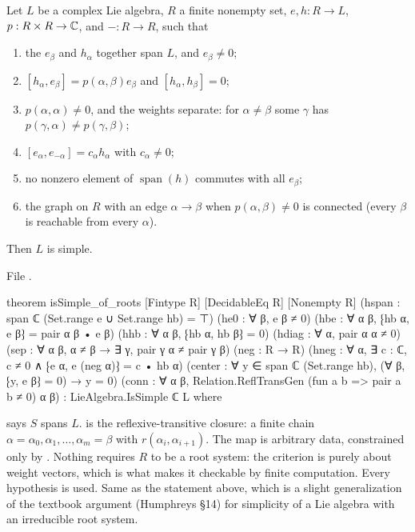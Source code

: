 \begin{theorem}\label{l23:thm:rootspace}
Let $L$ be a complex Lie algebra, $R$ a finite nonempty set, $e,h:R\to L$, $p:R\times R\to{\mathbb{C}}$, and $-:R\to R$, such that
\begin{enumerate}
\item the $e_\beta$ and $h_\alpha$ together span $L$, and $e_\beta\ne0$;
\item $[h_\alpha,e_\beta]=p(\alpha,\beta)e_\beta$ and $[h_\alpha,h_\beta]=0$;
\item $p(\alpha,\alpha)\ne0$, and the weights separate: for $\alpha\ne\beta$ some $\gamma$ has $p(\gamma,\alpha)\ne p(\gamma,\beta)$;
\item $[e_\alpha,e_{-\alpha}]=c_\alpha h_\alpha$ with $c_\alpha\neq0$;
\item no nonzero element of $\operatorname{span}(h)$ commutes with all $e_\beta$;
\item the graph on $R$ with an edge $\alpha\to\beta$ when $p(\alpha,\beta)\ne0$ is connected (every $\beta$ is reachable from every
  $\alpha$).
\end{enumerate}
Then $L$ is simple.
\end{theorem}
\noindent File .
\begin{leancode}
theorem isSimple_of_roots [Fintype R] [DecidableEq R] [Nonempty R]
    (hspan : span ℂ (Set.range e ∪ Set.range hb) = ⊤)
    (he0 : ∀ β, e β ≠ 0)
    (hbe : ∀ α β, ⁅hb α, e β⁆ = pair α β • e β)
    (hhb : ∀ α β, ⁅hb α, hb β⁆ = 0)
    (hdiag : ∀ α, pair α α ≠ 0)
    (sep : ∀ α β, α ≠ β → ∃ γ, pair γ α ≠ pair γ β)
    (neg : R → R) (hneg : ∀ α, ∃ c : ℂ, c ≠ 0 ∧ ⁅e α, e (neg α)⁆ = c • hb α)
    (center : ∀ y ∈ span ℂ (Set.range hb), (∀ β, ⁅y, e β⁆ = 0) → y = 0)
    (conn : ∀ α β, Relation.ReflTransGen (fun a b => pair a b ≠ 0) α β) :
    LieAlgebra.IsSimple ℂ L where
\end{leancode}

\begin{dictionary}
 says $S$ spans $L$.  is the reflexive-transitive closure: a finite chain
$\alpha=\alpha_0,\alpha_1,\dots,\alpha_m=\beta$ with $r(\alpha_i,\alpha_{i+1})$. The map  is arbitrary data, constrained
only by . Nothing requires $R$ to be a root system: the criterion is purely about weight vectors, which is what makes it
checkable by finite computation. Every hypothesis is used. Same as the statement above, which is a slight generalization of the
textbook argument (Humphreys \S14) for simplicity of a Lie algebra with an irreducible root system.
\end{dictionary}

